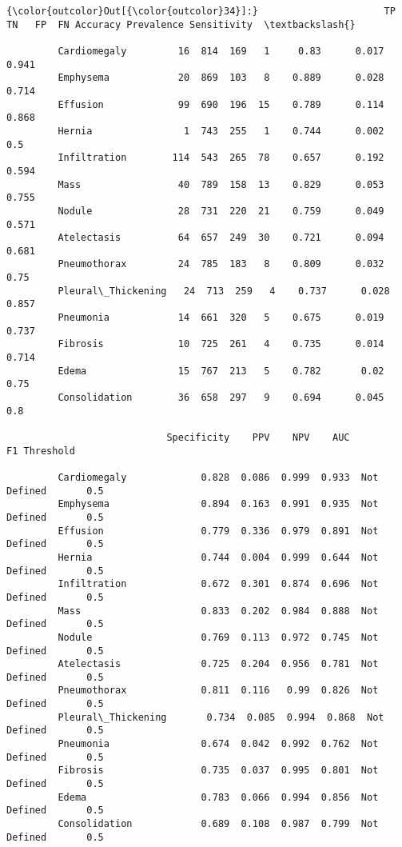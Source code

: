 \documentclass[11pt]{article}
\begin{document}
\begin{Verbatim}[commandchars=\\\{\}]
{\color{outcolor}Out[{\color{outcolor}34}]:}                      TP   TN   FP  FN Accuracy Prevalence Sensitivity  \textbackslash{}
                                                                                 
         Cardiomegaly         16  814  169   1     0.83      0.017       0.941   
         Emphysema            20  869  103   8    0.889      0.028       0.714   
         Effusion             99  690  196  15    0.789      0.114       0.868   
         Hernia                1  743  255   1    0.744      0.002         0.5   
         Infiltration        114  543  265  78    0.657      0.192       0.594   
         Mass                 40  789  158  13    0.829      0.053       0.755   
         Nodule               28  731  220  21    0.759      0.049       0.571   
         Atelectasis          64  657  249  30    0.721      0.094       0.681   
         Pneumothorax         24  785  183   8    0.809      0.032        0.75   
         Pleural\_Thickening   24  713  259   4    0.737      0.028       0.857   
         Pneumonia            14  661  320   5    0.675      0.019       0.737   
         Fibrosis             10  725  261   4    0.735      0.014       0.714   
         Edema                15  767  213   5    0.782       0.02        0.75   
         Consolidation        36  658  297   9    0.694      0.045         0.8   
         
                            Specificity    PPV    NPV    AUC           F1 Threshold  
                                                                                     
         Cardiomegaly             0.828  0.086  0.999  0.933  Not Defined       0.5  
         Emphysema                0.894  0.163  0.991  0.935  Not Defined       0.5  
         Effusion                 0.779  0.336  0.979  0.891  Not Defined       0.5  
         Hernia                   0.744  0.004  0.999  0.644  Not Defined       0.5  
         Infiltration             0.672  0.301  0.874  0.696  Not Defined       0.5  
         Mass                     0.833  0.202  0.984  0.888  Not Defined       0.5  
         Nodule                   0.769  0.113  0.972  0.745  Not Defined       0.5  
         Atelectasis              0.725  0.204  0.956  0.781  Not Defined       0.5  
         Pneumothorax             0.811  0.116   0.99  0.826  Not Defined       0.5  
         Pleural\_Thickening       0.734  0.085  0.994  0.868  Not Defined       0.5  
         Pneumonia                0.674  0.042  0.992  0.762  Not Defined       0.5  
         Fibrosis                 0.735  0.037  0.995  0.801  Not Defined       0.5  
         Edema                    0.783  0.066  0.994  0.856  Not Defined       0.5  
         Consolidation            0.689  0.108  0.987  0.799  Not Defined       0.5  
\end{Verbatim}
            
\end{document}
